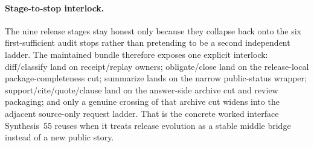\documentclass[11pt]{article}
\begin{document}
\paragraph{Stage-to-stop interlock.}
The nine release stages stay honest only because they collapse back onto the six first-sufficient audit stops rather than pretending to be a second independent ladder.
The maintained bundle therefore exposes one explicit interlock: diff/classify land on receipt/replay owners; obligate/close land on the release-local package-completeness cut; summarize lands on the narrow public-status wrapper; support/cite/quote/clause land on the answer-side archive cut and review packaging; and only a genuine crossing of that archive cut widens into the adjacent source-only request ladder.
That is the concrete worked interface Synthesis~55 reuses when it treats release evolution as a stable middle bridge instead of a new public story.\cite{series:releasespine,series:releaseclosure,series:statusenvelopes,series:seriesspines,series:challengeanswerdisclosurepackets,series:challengeanswerreviewmenus,series:pairedterminalcutoverrules}
\end{document}
